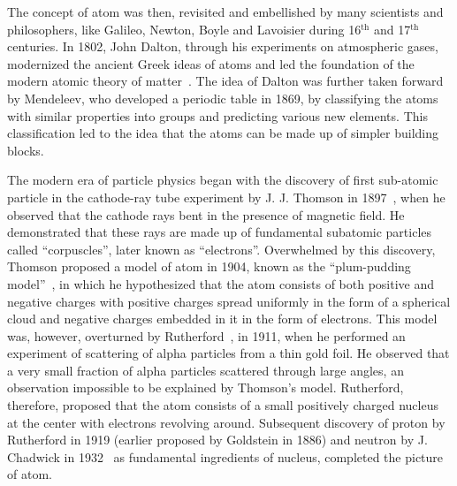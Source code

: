 The concept of atom was then, revisited and embellished by many scientists and philosophers, like Galileo, Newton,
Boyle and Lavoisier during 16$^{\textrm{th}}$ and 17$^{\textrm{th}}$ centuries.
In 1802, John Dalton, through his experiments on atmospheric gases, modernized the ancient Greek ideas of atoms and led the foundation of the modern
atomic theory of matter~\cite{Dalton-original, 10.2307-Dalton}.
The idea of Dalton was further taken forward by Mendeleev, who developed a periodic table in 1869, by classifying the atoms with similar properties into groups 
and predicting various new elements. This classification led to the idea that the atoms can be made up of simpler building blocks. 

The modern era of particle physics began with the discovery of first sub-atomic particle in the cathode-ray tube experiment by J. J. Thomson
in 1897~\cite{ElectronDiscovery}, when he observed that the cathode rays bent in the presence of magnetic field. He demonstrated that these rays are made up of
fundamental subatomic particles called ``corpuscles'', later known as ``electrons''. Overwhelmed by this discovery, Thomson proposed a
model of atom in 1904, known as the ``plum-pudding model''~\cite{ThomsonModel}, in which he hypothesized that the atom consists of both positive and negative charges with
positive charges spread uniformly in the form of a spherical cloud and negative charges embedded in it in the form of electrons.  
This model was, however, overturned by Rutherford~\cite{Rutherford:1911zz, Rutherford1913}, in 1911, when he performed an experiment of scattering of alpha particles from a thin gold foil. He
observed that a very small fraction of alpha particles scattered through large angles, an observation impossible to be explained by Thomson's model.
Rutherford, therefore, proposed that the atom consists of a small positively charged nucleus at the center with electrons revolving around.
Subsequent discovery of proton by Rutherford in 1919 (earlier proposed by Goldstein in 1886) and neutron by J. Chadwick in 1932~\cite{Chadwick1932}
as fundamental ingredients of nucleus, completed the picture of atom. 

